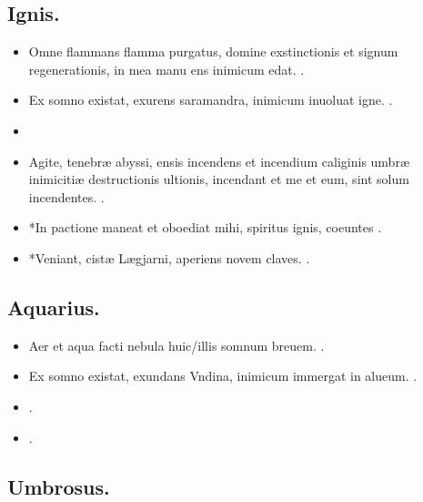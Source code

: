 \documentclass[12pt]{book}
\newcommand{\reconst}{*}
\begin{document}
\subsection{Ignis.}\label{ignis}

\begin{itemize}
  \item Omne flammans flamma purgatus,
        domine exstinctionis et signum regenerationis,
        in mea manu ens inimicum edat.
        .
  \item Ex somno existat, exurens saramandra, inimicum inuoluat igne.
        .
  \item {}
  \item Agite, tenebræ abyssi, ensis incendens et incendium
        caliginis umbræ inimicitiæ destructionis ultionis,
        incendant et me et eum, sint solum incendentes.
        .
  \item \reconst{}In pactione maneat et oboediat mihi, spiritus ignis, coeuntes \textelp{}
        .
  \item \reconst{}Veniant, cistæ Lægjarni, aperiens novem claves.
        .
\end{itemize}

\subsection{Aquarius.}\label{aquarius}

\begin{itemize}
  \item Aer et aqua facti nebula huic/illis somnum breuem. .
  \item Ex somno existat, exundans Vndina, inimicum immergat in alueum. .
  \item {}.
  \item {}.
\end{itemize}

\subsection{Umbrosus.}\label{umbrosus}
\end{document}
